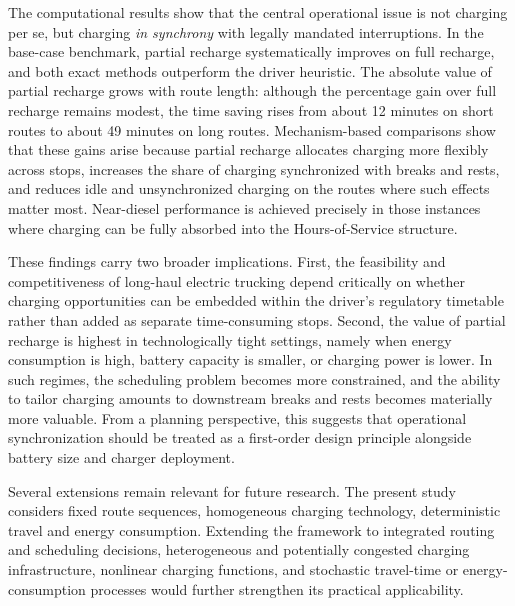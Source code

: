 \documentclass[3p,11pt,authoryear]{elsarticle}  %
\begin{document}
The computational results show that the central operational issue is not charging per se, but charging \emph{in synchrony} with legally mandated interruptions. In the base-case benchmark, partial recharge systematically improves on full recharge, and both exact methods outperform the driver heuristic. The absolute value of partial recharge grows with route length: although the percentage gain over full recharge remains modest, the time saving rises from about 12 minutes on short routes to about 49 minutes on long routes. Mechanism-based comparisons show that these gains arise because partial recharge allocates charging more flexibly across stops, increases the share of charging synchronized with breaks and rests, and reduces idle and unsynchronized charging on the routes where such effects matter most. Near-diesel performance is achieved precisely in those instances where charging can be fully absorbed into the Hours-of-Service structure. 

These findings carry two broader implications. First, the feasibility and competitiveness of long-haul electric trucking depend critically on whether charging opportunities can be embedded within the driver’s regulatory timetable rather than added as separate time-consuming stops. Second, the value of partial recharge is highest in technologically tight settings, namely when energy consumption is high, battery capacity is smaller, or charging power is lower. In such regimes, the scheduling problem becomes more constrained, and the ability to tailor charging amounts to downstream breaks and rests becomes materially more valuable. From a planning perspective, this suggests that operational synchronization should be treated as a first-order design principle alongside battery size and charger deployment. 

Several extensions remain relevant for future research. The present study considers fixed route sequences, homogeneous charging technology, deterministic travel and energy consumption. Extending the framework to integrated routing and scheduling decisions, heterogeneous and potentially congested charging infrastructure, nonlinear charging functions, and stochastic travel-time or energy-consumption processes would further strengthen its practical applicability. 

\end{document}
